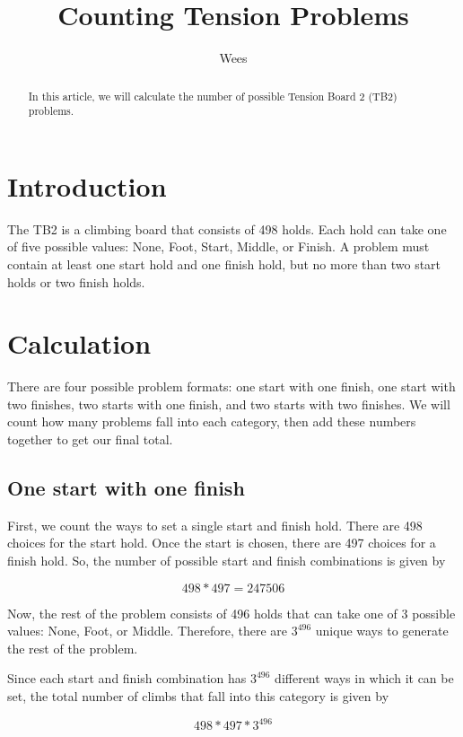 \documentclass{article}
\title{Counting Tension Problems}
\author{Wees}
\begin{document}
\maketitle

\begin{abstract}
In this article, we will calculate the number of possible Tension Board 2 (TB2) problems.
\end{abstract}

\section{Introduction}

The TB2 is a climbing board that consists of 498 holds. Each hold can take one of five possible values: None, Foot, Start, Middle, or Finish. A problem must contain at least one start hold and one finish hold, but no more than two start holds or two finish holds. 

\section{Calculation}

There are four possible problem formats: one start with one finish, one start with two finishes, two starts with one finish, and two starts with two finishes. We will count how many problems fall into each category, then add these numbers together to get our final total. 

\subsection{One start with one finish}

First, we count the ways to set a single start and finish hold. There are 498 choices for the start hold. Once the start is chosen, there are 497 choices for a finish hold. So, the number of possible start and finish combinations is given by

\[498 * 497 = 247506\]

Now, the rest of the problem consists of 496 holds that can take one of 3 possible values: None, Foot, or Middle. Therefore, there are $3^{496}$ unique ways to generate the rest of the problem. 

Since each start and finish combination has $3^{496}$ different ways in which it can be set, the total number of climbs that fall into this category is given by

\[498 * 497 * 3 ^ {496}\]
\end{document}
